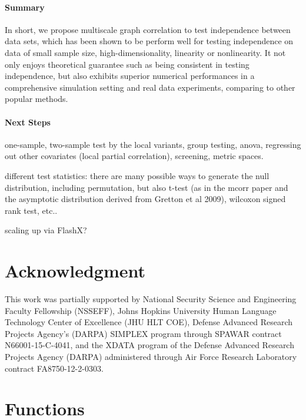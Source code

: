 \documentclass[11pt]{article}
\newcommand{\cs}[1]{{\color{blue}{#1}}}
\begin{document}
\paragraph{Summary}

In short, we propose multiscale graph correlation to test independence between data sets, which has been shown to be perform well for testing independence on data of small sample size, high-dimensionality, linearity or nonlinearity. It not only enjoys theoretical guarantee such as being consistent in testing independence, but also exhibits superior numerical performances in a comprehensive simulation setting and real data experiments, comparing to other popular methods.


\paragraph{Next Steps}

one-sample, two-sample test by the local variants, group testing, anova, regressing out other covariates (local partial correlation), screening, metric spaces.

different test statistics: there are many possible ways to generate the null distribution, including permutation, but also t-test (as in the mcorr paper \cite{SzekelyRizzo2013a} and the asymptotic distribution derived from Gretton et al 2009), wilcoxon signed rank test, etc..
\cs{not sure which paper of Gretton you mean here}

scaling up via FlashX?

\section*{Acknowledgment}
This work was partially supported by 
% 
National Security Science and Engineering Faculty Fellowship (NSSEFF), 
% 
Johns Hopkins University Human Language Technology Center of Excellence (JHU HLT COE), 
% 
Defense Advanced Research Projects Agency's (DARPA) SIMPLEX program through SPAWAR contract N66001-15-C-4041, 
% 
and the XDATA program of the Defense Advanced Research Projects Agency (DARPA) administered through Air Force Research Laboratory contract FA8750-12-2-0303.



\appendix
\setcounter{figure}{0}
\renewcommand\thefigure{\arabic{figure}} 

\section{Functions}
\label{appen:a}
\end{document}
